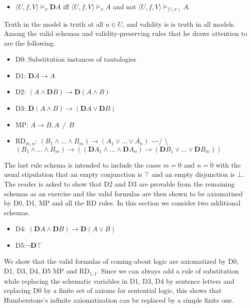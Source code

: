 \documentclass[
  11pt,
  letterpaper,
  DIV=11,
  numbers=noendperiod,
  twoside]{scrartcl}
\providecommand{\tightlist}{%
  \setlength{\itemsep}{0pt}\setlength{\parskip}{0pt}}
\begin{document}
\begin{itemize}
\tightlist
\item
  \(\langle U,f,V\rangle \models _x \mathbf{D}A\) iff
  \(\langle U,f,V\!\rangle \models _x A\) and not
  \(\langle U,f,V\!\rangle \models _{f(x)} A\).
\end{itemize}

Truth in the model is truth at all \(u{\in}U\), and validity is is truth
in all models. Among the valid schemas and validity-preserving rules
that he draws attention to are the following:

\begin{itemize}
\tightlist
\item
  D0: Substitution instances of tautologies
\item
  D1: \(\mathbf{D}A\rightarrow A\)
\item
  D2: \((A\wedge\mathbf{D}B) \rightarrow \mathbf{D}(A\wedge B)\)
\item
  D3:
  \(\mathbf{D}(A\wedge B) \rightarrow (\mathbf{D}A\vee \mathbf{D}B)\)
\item
  MP: \(A\rightarrow B, A ~~/~~ B\)
\item
  RD\(_{m,n}\):
  \((B_1 \wedge {\ldots}\wedge B_m) \rightarrow (A_1\vee {\ldots}\vee A_n)\)
  \textasciitilde\textasciitilde/
  \textbackslash{}\((B_1 \wedge {\ldots}\wedge B_m) \rightarrow ((\mathbf{D}A_1\wedge {\ldots}\wedge \mathbf{D}A_n) \rightarrow (\mathbf{D}B_1 \vee {\ldots}\vee \mathbf{D}B_m))\)
\end{itemize}

The last rule schema is intended to include the cases \(m=0\) and
\(n=0\) with the usual stipulation that an empty conjunction is \(\top\)
and an empty disjunction is \(\bot\). The reader is asked to show that
D2 and D3 are provable from the remaining schemas as an exercise and the
valid formulas are then shown to be axiomatized by D0, D1, MP and all
the RD rules. In this section we consider two additional schemas.

\begin{itemize}
\tightlist
\item
  D4:
  \((\mathbf{D}A\wedge \mathbf{D}B) \rightarrow \mathbf{D}(A\vee B)\)
\item
  D5:\(\neg \mathbf{D}\top\)
\end{itemize}

We show that the valid formulas of coming-about logic are axiomatized by
D0, D1, D3, D4, D5 MP and RD\(_{1,1}\). Since we can always add a rule
of substitution while replacing the schematic variables in D1, D3, D4 by
sentence letters and replacing D0 by a finite set of axioms for
sentential logic, this shows that Humberstone's infinite axiomatization
can be replaced by a simple finite one.
\end{document}
